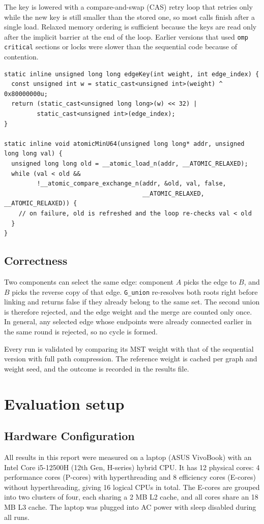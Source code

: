 \documentclass[11pt,a4paper]{article}
\begin{document}
The key is lowered with a compare-and-swap (CAS) retry loop that retries only while the new key is still smaller than the stored one, so most calls finish after a single load. Relaxed memory ordering is sufficient because the keys are read only after the implicit barrier at the end of the loop. Earlier versions that used \texttt{omp critical} sections or locks were slower than the sequential code because of contention.

\begin{lstlisting}
static inline unsigned long long edgeKey(int weight, int edge_index) {
  const unsigned int w = static_cast<unsigned int>(weight) ^ 0x80000000u;
  return (static_cast<unsigned long long>(w) << 32) |
         static_cast<unsigned int>(edge_index);
}

static inline void atomicMinU64(unsigned long long* addr, unsigned long long val) {
  unsigned long long old = __atomic_load_n(addr, __ATOMIC_RELAXED);
  while (val < old &&
         !__atomic_compare_exchange_n(addr, &old, val, false,
                                      __ATOMIC_RELAXED, __ATOMIC_RELAXED)) {
    // on failure, old is refreshed and the loop re-checks val < old
  }
}
\end{lstlisting}

\subsection*{Correctness}
Two components can select the same edge: component $A$ picks the edge to $B$, and $B$ picks the reverse copy of that edge. \texttt{G\_union} re-resolves both roots right before linking and returns false if they already belong to the same set. The second union is therefore rejected, and the edge weight and the merge are counted only once. In general, any selected edge whose endpoints were already connected earlier in the same round is rejected, so no cycle is formed.

Every run is validated by comparing its MST weight with that of the sequential version with full path compression. The reference weight is cached per graph and weight seed, and the outcome is recorded in the results file.

\section*{Evaluation setup}

\subsection*{Hardware Configuration}
All results in this report were measured on a laptop (ASUS VivoBook) with an Intel Core i5-12500H (12th Gen, H-series) hybrid CPU. It has 12 physical cores: 4 performance cores (P-cores) with hyperthreading and 8 efficiency cores (E-cores) without hyperthreading, giving 16 logical CPUs in total. The E-cores are grouped into two clusters of four, each sharing a 2 MB L2 cache, and all cores share an 18 MB L3 cache. The laptop was plugged into AC power with sleep disabled during all runs.
\end{document}
